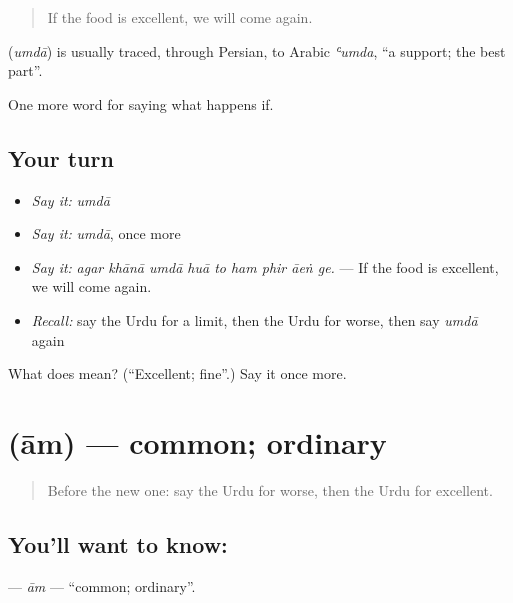 \begin{quote}
If the food is excellent, we will come again.
\end{quote}

\begin{cousinweb}
\textbf{} (\emph{umdā}) is usually traced, through Persian, to Arabic \emph{ʿumda}, \textquotedblleft{}a support; the best part\textquotedblright{}.
\end{cousinweb}

\begin{grammarlens}[title={What you've built}]
One more word for saying what happens if.
\end{grammarlens}

\subsection*{Your turn}
\begin{itemize}
\raggedright
  \item \emph{Say it:} \emph{umdā}
  \item \emph{Say it:} \emph{umdā}, once more
  \item \emph{Say it:} \emph{agar khānā umdā huā to ham phir āeṅ ge.} — If the food is excellent, we will come again.
  \item \emph{Recall:} say the Urdu for a limit, then the Urdu for worse, then say \emph{umdā} again
\end{itemize}

\begin{tcolorbox}[breakable,colback=teal!4,colframe=teal!35!black,title={Before you move on}]
What does  mean? (\textquotedblleft{}Excellent; fine\textquotedblright{}.) Say it once more.
\end{tcolorbox}
\section[\texorpdfstring{\ur{عام} (ām)}{عام (ām)}]{ (ām) — common; ordinary}

\label{lesson:UR-C377-am}



\begin{quote}
Before the new one: say the Urdu for worse, then the Urdu for excellent.
\end{quote}

\subsection*{You'll want to know: }
\textbf{} — \emph{ām} — \textquotedblleft{}common; ordinary\textquotedblright{}.

